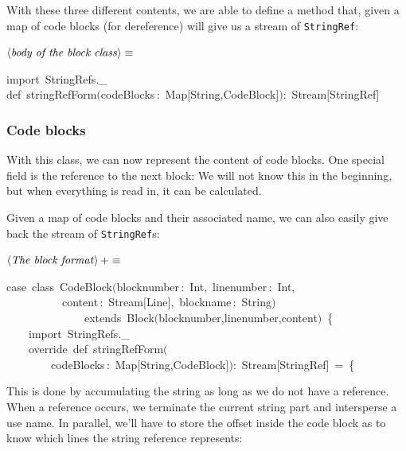 \documentclass[a4paper,12pt]{article}
\begin{document}
With these three different contents, we are able to define a method
that, given a map of code blocks (for dereference) will give us a
stream of \texttt{StringRef}:

$\left<\mbox{\emph{body of the block class}}\right>\equiv$
\begin{program}{\vem import}~StringRefs.\_
\\[0.5em]{\vem def}~stringRefForm$($codeBlocks\,{\rm :}~Map$[$String,CodeBlock$]$$)${\rm :}~Stream$[$StringRef$]$
\\[0.5em]\end{program}



\subsubsection{Code blocks}
With this class, we can now represent the content of code blocks.
One special field is the reference to the next block: We will not
know this in the beginning, but when everything is read in, it
can be calculated.

Given a map of code blocks and their associated name, we can also
easily give back the stream of \texttt{StringRef}s:

$\left<\mbox{\emph{The block format}}\right>+\equiv$
\begin{program}{\vem case}~{\vem class}~CodeBlock$($blocknumber\,{\rm :}~Int,~linenumber\,{\rm :}~Int,
\\~~~~~~~~~~content\,{\rm :}~Stream$[$Line$]$,~blockname\,{\rm :}~String$)$
\\~~~~~~~~~~~~~~{\vem extends}~Block$($blocknumber,linenumber,content$)$~{\small\{}
\\~~~~{\vem import}~StringRefs.\_
\\~~~~{\vem override}~{\vem def}~stringRefForm$($
\\~~~~~~~~codeBlocks\,{\rm :}~Map$[$String,CodeBlock$]$$)${\rm :}~Stream$[$StringRef$]$~=~{\small\{}
\\[0.5em]\end{program}



This is done by accumulating the string as long as we do not have
a reference. When a reference occurs, we terminate the current string
part and intersperse a use name. In parallel, we'll have to store the
offset inside the code block as to know which lines the string reference
represents:
\end{document}
